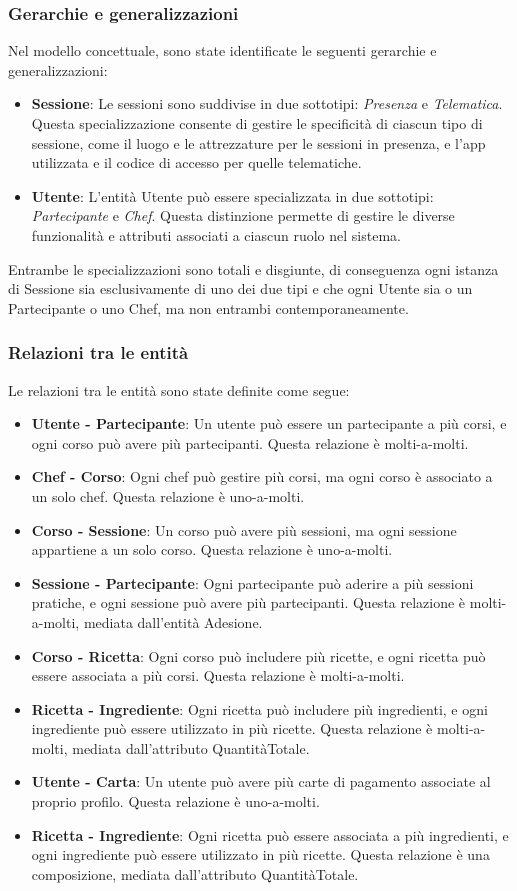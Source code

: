 \subsubsection{Gerarchie e generalizzazioni}
Nel modello concettuale, sono state identificate le seguenti gerarchie e generalizzazioni:
\begin{itemize}
    \item \textbf{Sessione}: Le sessioni sono suddivise in due sottotipi: \textit{Presenza} e \textit{Telematica}. Questa specializzazione consente di gestire le specificità di ciascun tipo di sessione, come il luogo e le attrezzature per le sessioni in presenza, e l'app utilizzata e il codice di accesso per quelle telematiche.
    \item \textbf{Utente}: L'entità Utente può essere specializzata in due sottotipi: \textit{Partecipante} e \textit{Chef}. Questa distinzione permette di gestire le diverse funzionalità e attributi associati a ciascun ruolo nel sistema.
\end{itemize}
Entrambe le specializzazioni sono totali e disgiunte, di conseguenza ogni istanza di Sessione sia esclusivamente di uno dei due tipi e che ogni Utente sia o un Partecipante o uno Chef, ma non entrambi contemporaneamente.
\subsubsection{Relazioni tra le entità}
Le relazioni tra le entità sono state definite come segue:
\begin{itemize}
    \item \textbf{Utente - Partecipante}: Un utente può essere un partecipante a più corsi, e ogni corso può avere più partecipanti. Questa relazione è molti-a-molti.
    \item \textbf{Chef - Corso}: Ogni chef può gestire più corsi, ma ogni corso è associato a un solo chef. Questa relazione è uno-a-molti.
    \item \textbf{Corso - Sessione}: Un corso può avere più sessioni, ma ogni sessione appartiene a un solo corso. Questa relazione è uno-a-molti.
    \item \textbf{Sessione - Partecipante}: Ogni partecipante può aderire a più sessioni pratiche, e ogni sessione può avere più partecipanti. Questa relazione è molti-a-molti, mediata dall'entità Adesione.
    \item \textbf{Corso - Ricetta}: Ogni corso può includere più ricette, e ogni ricetta può essere associata a più corsi. Questa relazione è molti-a-molti.
    \item \textbf{Ricetta - Ingrediente}: Ogni ricetta può includere più ingredienti, e ogni ingrediente può essere utilizzato in più ricette. Questa relazione è molti-a-molti, mediata dall'attributo QuantitàTotale.
    \item \textbf{Utente - Carta}: Un utente può avere più carte di pagamento associate al proprio profilo. Questa relazione è uno-a-molti.
    \item \textbf{Ricetta - Ingrediente}: Ogni ricetta può essere associata a più ingredienti, e ogni ingrediente può essere utilizzato in più ricette. Questa relazione è una composizione, mediata dall'attributo QuantitàTotale.
\end{itemize}
